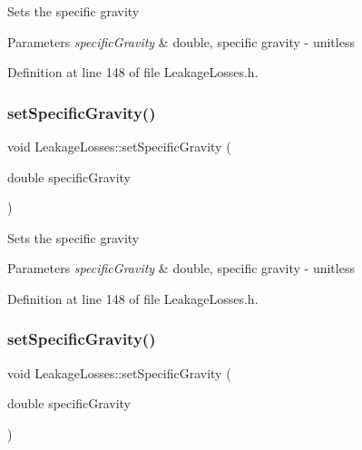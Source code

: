 Sets the specific gravity 
\begin{DoxyParams}{Parameters}
{\em specific\+Gravity} & double, specific gravity -\/ unitless \\
\hline
\end{DoxyParams}


Definition at line 148 of file Leakage\+Losses.\+h.

\mbox{\label{class_leakage_losses_ab017828413655c5903374564e8718fac}} 
\subsubsection{\texorpdfstring{set\+Specific\+Gravity()}{setSpecificGravity()}\hspace{0.1cm}{\footnotesize\ttfamily [2/3]}}
{\footnotesize\ttfamily void Leakage\+Losses\+::set\+Specific\+Gravity (\begin{DoxyParamCaption}\item[{double}]{specific\+Gravity }\end{DoxyParamCaption})\hspace{0.3cm}{\ttfamily [inline]}}

Sets the specific gravity 
\begin{DoxyParams}{Parameters}
{\em specific\+Gravity} & double, specific gravity -\/ unitless \\
\hline
\end{DoxyParams}


Definition at line 148 of file Leakage\+Losses.\+h.

\mbox{\label{class_leakage_losses_ab017828413655c5903374564e8718fac}} 
\subsubsection{\texorpdfstring{set\+Specific\+Gravity()}{setSpecificGravity()}\hspace{0.1cm}{\footnotesize\ttfamily [3/3]}}
{\footnotesize\ttfamily void Leakage\+Losses\+::set\+Specific\+Gravity (\begin{DoxyParamCaption}\item[{double}]{specific\+Gravity }\end{DoxyParamCaption})\hspace{0.3cm}{\ttfamily [inline]}}


